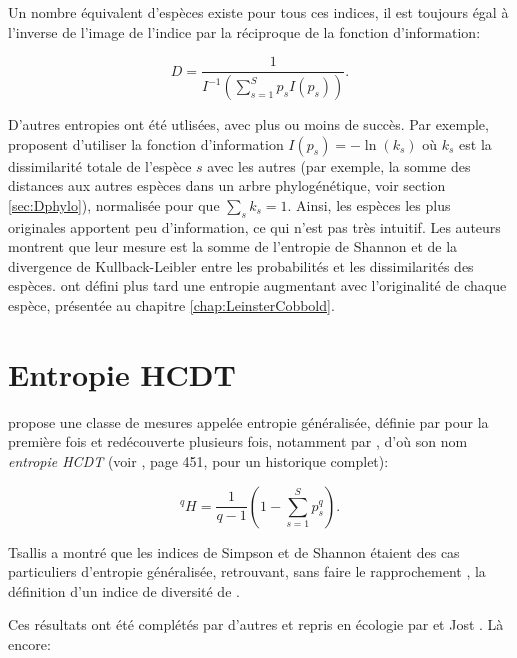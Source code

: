 \documentclass[
  11pt,
  french,
  a4paper,
  extrafontsizes,onecolumn,openright
  ]{memoir}
\begin{document}
Un nombre équivalent d'espèces existe pour tous ces indices, il est toujours égal à l'inverse de l'image de l'indice par la réciproque de la fonction d'information:

\begin{equation}
  \label{eq:Gregorius2014}
  D = \frac{1}{I^{-1}\left(\sum^S_{s=1}{p_s I(p_s)}\right)}.
\end{equation}

D'autres entropies ont été utlisées, avec plus ou moins de succès.
Par exemple, \textcite{Ricotta2003c} proposent d'utiliser la fonction d'information \(I(p_s)=-\ln(k_s)\) où \(k_s\) est la dissimilarité totale de l'espèce \(s\) avec les autres (par exemple, la somme des distances aux autres espèces dans un arbre phylogénétique, voir section \ref{sec:Dphylo}), normalisée pour que \(\sum_s{k_s}=1\).
Ainsi, les espèces les plus originales apportent peu d'information, ce qui n'est pas très intuitif.
Les auteurs montrent que leur mesure est la somme de l'entropie de Shannon et de la divergence de Kullback-Leibler entre les probabilités et les dissimilarités des espèces.
\textcite{Ricotta2006b} ont défini plus tard une entropie augmentant avec l'originalité de chaque espèce, présentée au chapitre \ref{chap:LeinsterCobbold}.

\hypertarget{entropie-hcdt}{%
\section{Entropie HCDT}\label{entropie-hcdt}}

\textcite{Tsallis1988} propose une classe de mesures appelée entropie généralisée, définie par \textcite{Havrda1967} pour la première fois et redécouverte plusieurs fois, notamment par \textcite{Daroczy1970}, d'où son nom \emph{entropie HCDT} (voir \textcite{Mendes2008}, page 451, pour un historique complet):

\begin{equation}
  \label{eq:HCDT}
  ^{q}\!H = \frac{1}{q-1}\left(1-\sum^S_{s=1}{p^q_s}\right).
\end{equation}

Tsallis a montré que les indices de Simpson et de Shannon étaient des cas particuliers d'entropie généralisée, retrouvant, sans faire le rapprochement \autocite{Ricotta2005}, la définition d'un indice de diversité de \textcite{Patil1982}.

Ces résultats ont été complétés par d'autres et repris en écologie par \textcite{Keylock2005} et Jost \autocite*{Jost2006,Jost2007}.
Là encore:
\end{document}
